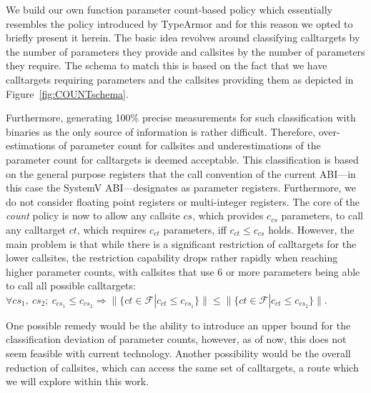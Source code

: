 We build our own function parameter count-based policy which essentially resembles the policy introduced by TypeArmor \cite{veen:typearmor} and
for this reason we opted to briefly present it herein.
The basic idea revolves around classifying calltargets by the number of parameters they provide and callsites 
by the number of parameters they require. The schema to match this is based on the fact that we  
have calltargets requiring parameters and the callsites providing them as depicted in Figure~\ref{fig:COUNTschema}.

Furthermore, generating 100\% precise measurements for such classification with binaries as the only source of information is rather difficult. 
Therefore, over-estimations of parameter count for callsites and underestimations of the parameter count for calltargets is deemed acceptable. 
This classification is based on the general purpose registers that the call convention of the current ABI---in this case the 
SystemV ABI---designates as parameter registers. Furthermore, we do not consider floating point registers or multi-integer registers. 
The core of the \emph{count} policy is now to allow any callsite $cs$, which provides $c_{cs}$ parameters, to call any calltarget $ct$, 
which requires $c_{ct}$ parameters, iff $c_{ct} \leq c_{cs}$ holds. However, the main problem is that while there is a significant 
restriction of calltargets for the lower callsites, the restriction capability drops rather rapidly when reaching higher parameter 
counts, with callsites that use 6 or more parameters being able to call all possible calltargets:
$\forall cs_1, \ cs_2; \ c_{cs_1} \leq c_{cs_2} \Longrightarrow  \| \{ct \in \mathcal{F} | c_{ct} \leq c_{cs_1} \} \| \leq \| \{ct \in \mathcal{F} | c_{ct} \leq c_{cs_2}  \} \|$.

One possible remedy would be the ability to introduce an upper bound for the classification deviation of parameter counts, 
however, as of now, this does not seem feasible with current technology. Another possibility would be the overall reduction
of callsites, which can access the same set of calltargets, a route which we will explore within this work.


